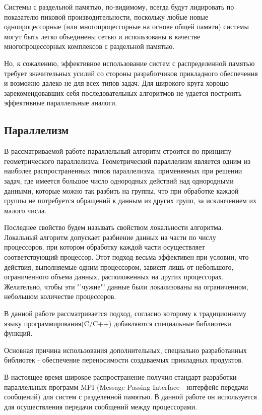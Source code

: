 \begin{enumerate}
Системы с раздельной памятью, по-видимому, всегда будут лидировать по показателю
пиковой производительности, поскольку любые новые однопроцессорные (или
многопроцессорные на основе общей памяти) системы могут быть легко объединены
сетью и использованы в качестве многопроцессорных комплексов с раздельной
памятью. 

Но, к сожалению, эффективное использование систем с распределенной памятью
требует значительных усилий со стороны разработчиков прикладного обеспечения и
возможно далеко не для всех типов задач. Для широкого круга хорошо
зарекомендовавших себя последовательных алгоритмов не удается построить
эффективные параллельные аналоги.
\end{enumerate}


\subsection{Параллелизм}

В рассматриваемой работе параллельный алгоритм строится по принципу
геометрического параллелизма.
Геометрический параллелизм является одним из наиболее распространенных типов
параллелизма, применяемых при решении задач, где имеется большое число
однородных действий над однородными данными, которые можно так разбить на
группы, что при обработке каждой группы не потребуется обращений к данным из
других групп, за исключением их малого числа.

Последнее свойство будем называть свойством локальности алгоритма. Локальный
алгоритм допускает разбиение данных на части по числу процессоров, при котором
обработку каждой части осуществляет соответствующий процессор. Этот подход
весьма эффективен при условии, что действия, выполняемые одним процессором,
зависят лишь от небольшого, ограниченного объема данных, расположенных на других
процессорах. Желательно, чтобы эти "'чужие"' данные были локализованы на
ограниченном, небольшом количестве процессоров.

В данной работе рассматривается подход, согласно которому к традиционному
языку программирования(C/C++) добавляются специальные
библиотеки функций.

Основная причина использования дополнительных, специально разработанных
библиотек - обеспечение переносимости создаваемых прикладных продуктов.

В настоящее время широкое распространение получил стандарт разработки
параллельных программ MPI (Message Passing Interface - интерфейс передачи
сообщений) для систем с разделенной памятью. 
В данной работе он используется для осуществления передачи
сообщений между процессорами.


